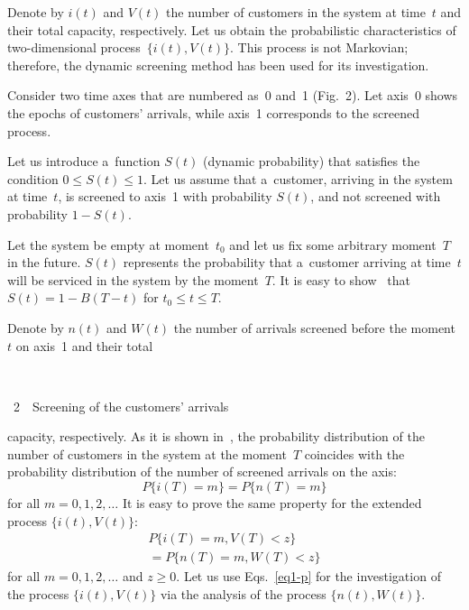 \begin{multicols}{2}
 


Denote by $i(t)$ and $V(t)$ the number of customers in the system at 
time~$t$ and their total capacity, respectively. Let us obtain the probabilistic 
characteristics of two-dimensional process~$\{i(t),V(t)\}$. This process 
is not Markovian; therefore,  the dynamic screening method has been used for 
its investigation.

Consider two time axes that are numbered as~0 and~1 (Fig.~2). 
Let axis~0 shows the epochs of customers' arrivals, while axis~1 
corresponds to the screened process.



Let us introduce a~function $S(t)$ (dynamic probability) that satisfies the condition 
$0\le S(t) \le 1$.
Let us assume that a~customer, arriving in the system at time~$t$, is screened 
to axis~1 with probability $S(t)$, and not screened with probability $1-S(t)$.

Let the system be empty at moment~$t_0$ and let us fix some arbitrary moment~$T$ 
in the future. $S(t)$ represents the probability that a~customer arriving at time~$t$ 
will be serviced in the system by the moment~$T$. 
It is easy to show~\cite{lit5} that $S(t)=1-B(T-t) $ for $t_0\le t\le T$.




Denote by $n(t)$ and $W(t)$ the number of arrivals screened before the moment~$t$ 
on axis~1 and their total\linebreak\vspace*{-12pt}

{ \begin{center}  %
 \vspace*{9pt}
 \mbox{%
 \epsfxsize=77.897mm 
 }

\vspace*{6pt}

\noindent
{{\figurename~2}\ \ \small{Screening of the customers' arrivals}}


\end{center}
}


\addtocounter{figure}{1}

\noindent
 capacity, respectively. 
As it is shown in~\cite{lit4}, the probability distribution of the number of 
customers in the system at the moment~$T$ coincides with the probability 
distribution of the number of screened arrivals on the axis:
$$
P\{i(T)=m\}=P\{n(T)=m\}
$$
for all $m=0,1,2,\ldots$ It is easy to prove the same property for 
the extended process $\{i(t),V(t)\}$:
\begin{multline}
\label{eq1-p}
P\{i(T)=m,V(T)<z\}\\
{}=P\{n(T)=m,W(T)<z\}
\end{multline}
for all $m=0,1,2,\ldots$ and $z\ge 0$. 
Let us use Eqs.~\eqref{eq1-p} for the investigation of the process $\{i(t),V(t)\}$ 
via the analysis of the process $\{n(t),W(t)\}$.


\end{multicols}
